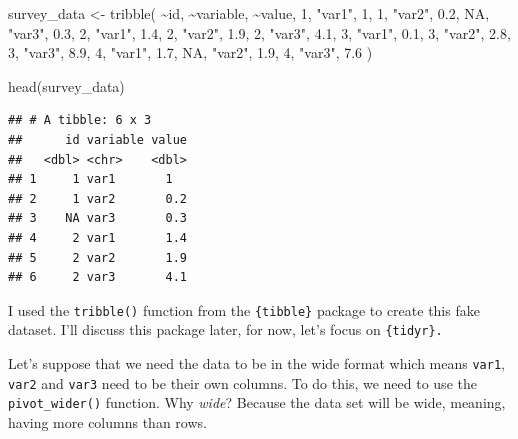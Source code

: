\documentclass[
]{article}
\newenvironment{Shaded}{\begin{snugshade}}{\end{snugshade}}
\newcommand{\ConstantTok}[1]{\textcolor[rgb]{0.00,0.00,0.00}{#1}}
\newcommand{\DecValTok}[1]{\textcolor[rgb]{0.00,0.00,0.81}{#1}}
\newcommand{\FloatTok}[1]{\textcolor[rgb]{0.00,0.00,0.81}{#1}}
\newcommand{\FunctionTok}[1]{\textcolor[rgb]{0.00,0.00,0.00}{#1}}
\newcommand{\NormalTok}[1]{#1}
\newcommand{\OtherTok}[1]{\textcolor[rgb]{0.56,0.35,0.01}{#1}}
\newcommand{\SpecialCharTok}[1]{\textcolor[rgb]{0.00,0.00,0.00}{#1}}
\newcommand{\StringTok}[1]{\textcolor[rgb]{0.31,0.60,0.02}{#1}}
\begin{document}
\begin{Shaded}
\begin{Highlighting}[]
\NormalTok{survey\_data }\OtherTok{\textless{}{-}} \FunctionTok{tribble}\NormalTok{(}
  \SpecialCharTok{\textasciitilde{}}\NormalTok{id, }\SpecialCharTok{\textasciitilde{}}\NormalTok{variable, }\SpecialCharTok{\textasciitilde{}}\NormalTok{value,}
  \DecValTok{1}\NormalTok{, }\StringTok{"var1"}\NormalTok{, }\DecValTok{1}\NormalTok{,}
  \DecValTok{1}\NormalTok{, }\StringTok{"var2"}\NormalTok{, }\FloatTok{0.2}\NormalTok{,}
  \ConstantTok{NA}\NormalTok{, }\StringTok{"var3"}\NormalTok{, }\FloatTok{0.3}\NormalTok{,}
  \DecValTok{2}\NormalTok{, }\StringTok{"var1"}\NormalTok{, }\FloatTok{1.4}\NormalTok{,}
  \DecValTok{2}\NormalTok{, }\StringTok{"var2"}\NormalTok{, }\FloatTok{1.9}\NormalTok{,}
  \DecValTok{2}\NormalTok{, }\StringTok{"var3"}\NormalTok{, }\FloatTok{4.1}\NormalTok{,}
  \DecValTok{3}\NormalTok{, }\StringTok{"var1"}\NormalTok{, }\FloatTok{0.1}\NormalTok{,}
  \DecValTok{3}\NormalTok{, }\StringTok{"var2"}\NormalTok{, }\FloatTok{2.8}\NormalTok{,}
  \DecValTok{3}\NormalTok{, }\StringTok{"var3"}\NormalTok{, }\FloatTok{8.9}\NormalTok{,}
  \DecValTok{4}\NormalTok{, }\StringTok{"var1"}\NormalTok{, }\FloatTok{1.7}\NormalTok{,}
  \ConstantTok{NA}\NormalTok{, }\StringTok{"var2"}\NormalTok{, }\FloatTok{1.9}\NormalTok{,}
  \DecValTok{4}\NormalTok{, }\StringTok{"var3"}\NormalTok{, }\FloatTok{7.6}
\NormalTok{)}

\FunctionTok{head}\NormalTok{(survey\_data)}
\end{Highlighting}
\end{Shaded}

\begin{verbatim}
## # A tibble: 6 x 3
##      id variable value
##   <dbl> <chr>    <dbl>
## 1     1 var1       1  
## 2     1 var2       0.2
## 3    NA var3       0.3
## 4     2 var1       1.4
## 5     2 var2       1.9
## 6     2 var3       4.1
\end{verbatim}

I used the \texttt{tribble()} function from the \texttt{\{tibble\}} package to create this fake dataset.
I'll discuss this package later, for now, let's focus on \texttt{\{tidyr\}.}

Let's suppose that we need the data to be in the wide format which means \texttt{var1}, \texttt{var2} and \texttt{var3}
need to be their own columns. To do this, we need to use the \texttt{pivot\_wider()} function. Why \emph{wide}?
Because the data set will be wide, meaning, having more columns than rows.
\end{document}

